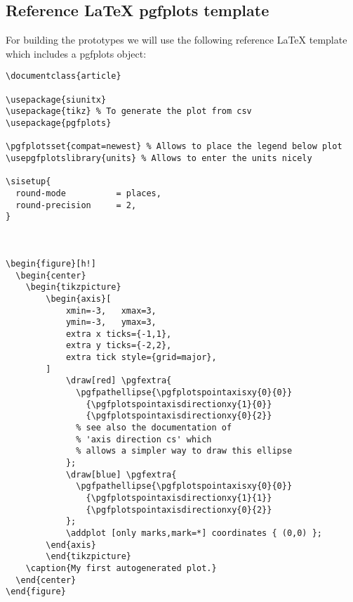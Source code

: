 \subsection{Reference LaTeX pgfplots template}
\label{subsec:reference_latex_pgfplots_template}
For building the prototypes we will use the following reference LaTeX template which includes a pgfplots object:~\cite{pgfplots_gallery_sourceforge}

\begin{lstlisting}[caption={Reference LaTeX template with a pgfplots object},label={lst:reference_latex_pgfplots_template},language={[LaTeX]{TeX}}]
\documentclass{article}

\usepackage{siunitx}
\usepackage{tikz} % To generate the plot from csv
\usepackage{pgfplots}

\pgfplotsset{compat=newest} % Allows to place the legend below plot
\usepgfplotslibrary{units} % Allows to enter the units nicely

\sisetup{
  round-mode          = places,
  round-precision     = 2,
}



\begin{figure}[h!]
  \begin{center}
    \begin{tikzpicture}
        \begin{axis}[
            xmin=-3,   xmax=3,
            ymin=-3,   ymax=3,
            extra x ticks={-1,1},
            extra y ticks={-2,2},
            extra tick style={grid=major},
        ]
            \draw[red] \pgfextra{
              \pgfpathellipse{\pgfplotspointaxisxy{0}{0}}
                {\pgfplotspointaxisdirectionxy{1}{0}}
                {\pgfplotspointaxisdirectionxy{0}{2}}
              % see also the documentation of
              % 'axis direction cs' which
              % allows a simpler way to draw this ellipse
            };
            \draw[blue] \pgfextra{
              \pgfpathellipse{\pgfplotspointaxisxy{0}{0}}
                {\pgfplotspointaxisdirectionxy{1}{1}}
                {\pgfplotspointaxisdirectionxy{0}{2}}
            };
            \addplot [only marks,mark=*] coordinates { (0,0) };
        \end{axis}
        \end{tikzpicture}
    \caption{My first autogenerated plot.}
  \end{center}
\end{figure}


\end{lstlisting}


